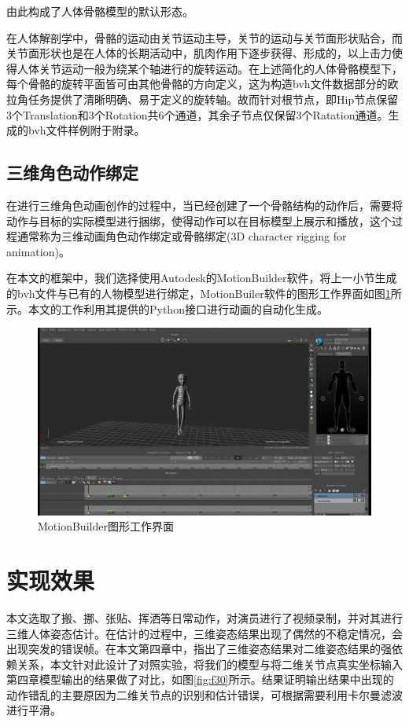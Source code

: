 由此构成了人体骨骼模型的默认形态。

在人体解剖学中，骨骼的运动由关节运动主导，关节的运动与关节面形状贴合，而关节面形状也是在人体的长期活动中，肌肉作用下逐步获得、形成的，以上击力使得人体关节运动一般为绕某个轴进行的旋转运动。在上述简化的人体骨骼模型下，每个骨骼的旋转平面皆可由其他骨骼的方向定义，这为构造bvh文件数据部分的欧拉角任务提供了清晰明确、易于定义的旋转轴。故而针对根节点，即Hip节点保留3个Translation和3个Rotation共6个通道，其余子节点仅保留3个Ratation通道。生成的bvh文件样例附于附录。

\subsection{三维角色动作绑定}{}
在进行三维角色动画创作的过程中，当已经创建了一个骨骼结构的动作后，需要将动作与目标的实际模型进行捆绑，使得动作可以在目标模型上展示和播放，这个过程通常称为三维动画角色动作绑定或骨骼绑定(3D character rigging for animation)。

在本文的框架中，我们选择使用Autodesk的MotionBuilder软件，将上一小节生成的bvh文件与已有的人物模型进行绑定，MotionBuiler软件的图形工作界面如图\ref{fig:f28}所示。本文的工作利用其提供的Python接口进行动画的自动化生成。

\begin{figure}[h]
	\centering
	\includegraphics[scale=0.3]{figures/28.png}
	\caption{MotionBuilder图形工作界面}
	\label{fig:f28}
\end{figure}


\section{实现效果}

本文选取了搬、挪、张贴、挥洒等日常动作，对演员进行了视频录制，并对其进行三维人体姿态估计。在估计的过程中，三维姿态结果出现了偶然的不稳定情况，会出现突发的错误帧。在本文第四章中，指出了三维姿态结果对二维姿态结果的强依赖关系，本文针对此设计了对照实验，将我们的模型与将二维关节点真实坐标输入第四章模型输出的结果做了对比，如图\ref{fig:f30}所示。结果证明输出结果中出现的动作错乱的主要原因为二维关节点的识别和估计错误，可根据需要利用卡尔曼滤波进行平滑。


